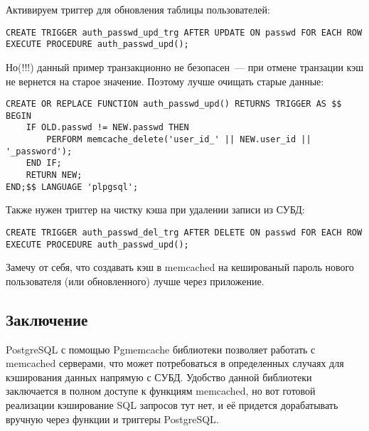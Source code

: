 Активируем триггер для обновления таблицы пользователей:

\begin{lstlisting}[label=lst:pgcache12,caption=Триггер]
CREATE TRIGGER auth_passwd_upd_trg AFTER UPDATE ON passwd FOR EACH ROW EXECUTE PROCEDURE auth_passwd_upd();
\end{lstlisting}

Но(!!!) данный пример транзакционно не безопасен~--- при отмене транзации кэш не вернется на старое значение. Поэтому лучше очищать старые данные:

\begin{lstlisting}[label=lst:pgcache13,caption=Очистка ключа в кэше]
CREATE OR REPLACE FUNCTION auth_passwd_upd() RETURNS TRIGGER AS $$
BEGIN
	IF OLD.passwd != NEW.passwd THEN
		PERFORM memcache_delete('user_id_' || NEW.user_id || '_password');
	END IF;
	RETURN NEW;
END;$$ LANGUAGE 'plpgsql';
\end{lstlisting}

Также нужен триггер на чистку кэша при удалении записи из СУБД:

\begin{lstlisting}[label=lst:pgcache14,caption=Триггер]
CREATE TRIGGER auth_passwd_del_trg AFTER DELETE ON passwd FOR EACH ROW EXECUTE PROCEDURE auth_passwd_upd();
\end{lstlisting}

Замечу от себя, что создавать кэш в memcached на кешированый пароль нового пользователя (или обновленного) лучше через приложение.

\subsection{Заключение}

PostgreSQL с помощью Pgmemcache библиотеки позволяет работать с memcached серверами, что может потребоваться в определенных случаях для кэширования данных напрямую с СУБД. Удобство данной библиотеки заключается в полном доступе к функциям memcached, но вот готовой реализации кэширование SQL запросов тут нет, и её придется дорабатывать вручную через функции и триггеры PostgreSQL.
